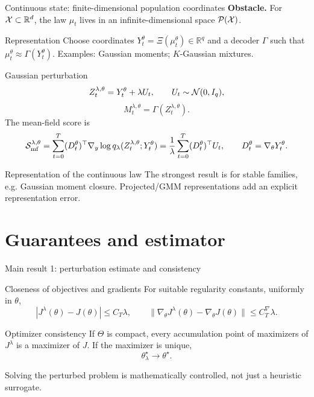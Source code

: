 \documentclass[9pt]{beamer}
\def\Xc{{\cal X}}
\def\Pc{{\cal P}}
\def\Sc{{\cal S}}
\def\Nc{{\cal N}}
\def\R{{\mathbb R}}
\newcommand{\good}[1]{\textcolor{Xgreen}{#1}}
\begin{document}
\begin{frame}{Continuous state: finite-dimensional population coordinates}
\textbf{Obstacle.}
For $\Xc\subset\R^d$, the law $\mu_t$ lives in an infinite-dimensional space $\Pc(\Xc)$.

\begin{block}{Representation}
Choose coordinates $Y_t^\theta = \Xi(\mu_t^\theta) \in\R^q$ and a decoder $\Gamma$ such that $\mu_t^\theta\approx \Gamma(Y_t^\theta)$.
Examples: Gaussian moments; $K$-Gaussian mixtures.
\end{block}

\begin{block}{Gaussian perturbation}
\[
  Z_t^{\lambda,\theta}=Y_t^\theta+\lambda U_t,
  \qquad U_t\sim\Nc(0,I_q),
\]
\[
  M_t^{\lambda,\theta}=\Gamma(Z_t^{\lambda,\theta}).
\]
The mean-field score is
\[
  \Sc_{\mathrm{mf}}^{\lambda,\theta}
  =\sum_{t=0}^T (D_t^\theta)^\top
  \nabla_y\log q_\lambda(Z_t^{\lambda,\theta};Y_t^\theta)
  =\frac1\lambda\sum_{t=0}^T(D_t^\theta)^\top U_t,
  \qquad D_t^\theta=\nabla_\theta Y_t^\theta.
\]
\end{block}

\begin{alertblock}{Representation of the continuous law}
The strongest result is for stable families, e.g. Gaussian moment closure. Projected/GMM representations add an explicit representation error.
\end{alertblock}
\end{frame}

\section{Guarantees and estimator}
\begin{frame}{Main result 1: perturbation estimate and consistency}
\begin{block}{Closeness of objectives and gradients}
For suitable regularity constants, uniformly in $\theta$,
\[
  |J^\lambda(\theta)-J(\theta)|\leq C_T\lambda,
  \qquad
  \|\nabla_\theta J^\lambda(\theta)-\nabla_\theta J(\theta)\|\leq C_T^\nabla\lambda.
\]
\end{block}
\begin{block}{Optimizer consistency}
If $\Theta$ is compact, every accumulation point of maximizers of $J^\lambda$ is a maximizer of $J$. If the maximizer is unique,
\[
  \theta_\lambda^\star\longrightarrow \theta^\star.
\]
\end{block}

\good{Solving the perturbed problem is mathematically controlled, not just a heuristic surrogate.}
\end{frame}
\end{document}
